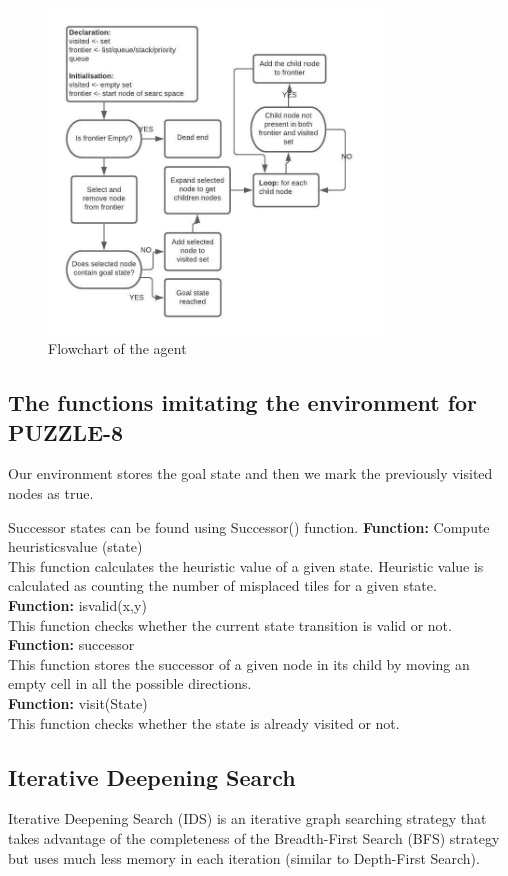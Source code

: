 \documentclass[journal, compsoc]{IEEEtran}
\begin{document}
\begin{figure}[!h]
\centering
\includegraphics[width=3.5in]{images/Week1.jpeg}
\caption{Flowchart of the agent}
\label{fig_sim}
\end{figure}


\subsection{The functions imitating the environment for PUZZLE-8}
Our environment stores the goal state and then we mark the
previously visited nodes as true.

Successor states can be found using Successor() function.
\textbf{Function:} Compute heuristics\textunderscore value (state) \\
This function calculates the heuristic value of a given state.
Heuristic value is calculated as counting the number of misplaced tiles for a given state. \\

\textbf{Function:} is\textunderscore valid(x,y) \\
This function checks whether the current state transition is valid or not. \\

\textbf{Function:} successor \\
This function stores the successor of
a given node in its child by moving an empty cell in all the
possible directions. \\

\textbf{Function:} visit(State) \\
This function checks whether the state is already visited or
not.

\subsection{Iterative Deepening Search}
Iterative Deepening Search (IDS) is an iterative graph searching strategy that takes advantage of the completeness of the Breadth-First Search (BFS) strategy but uses much less memory in each iteration (similar to Depth-First Search).
\end{document}
